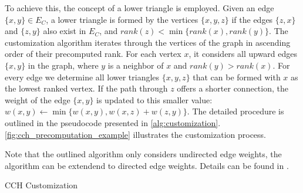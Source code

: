 To achieve this, the concept of a lower triangle is employed.
Given an edge \(\{x, y\} \in E_C\), a lower triangle is formed by the vertices \(\{x, y, z\}\) if the edges \(\{z, x\}\) and \(\{z, y\}\) also exist in \(E_C\), and \(rank(z) < \min\{rank(x), rank(y)\}\).
The customization algorithm iterates through the vertices of the graph in ascending order of their precomputed rank.
For each vertex \(x\), it considers all upward edges \(\{x, y\}\) in the graph, where \(y\) is a neighbor of \(x\) and \(rank(y) > rank(x)\).
For every edge we determine all lower triangles \(\{x, y, z\}\) that can be formed with \(x\) as the lowest ranked vertex.
If the path through \(z\) offers a shorter connection, the weight of the edge \(\{x, y\}\) is updated to this smaller value: \(w(x, y) \leftarrow \min\{w(x, y), w(x, z) + w(z, y)\}\).
The detailed procedure is outlined in the pseudocode presented in \cref{alg:customization}.
\cref{fig:cch_precomputation_example} illustrates the customization process.

Note that the outlined algorithm only considers undirected edge weights, the algorithm can be extendend to directed edge weights. Details can be found in \cite{dibbelt_customizable_2016}.

\begin{algorithm}
	\BlankLine
	\caption{CCH Customization}
	\label{alg:customization}
\end{algorithm}

